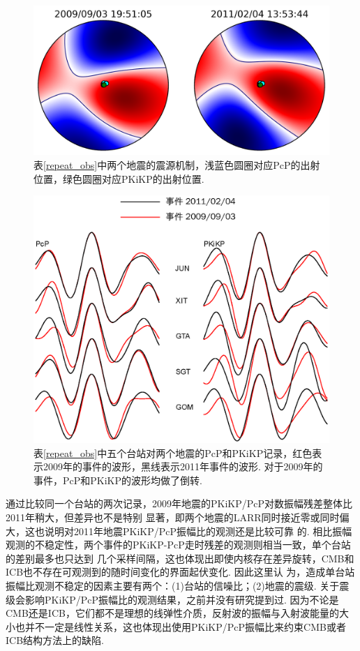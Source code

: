 \begin{figure}[ht]
\centering
\includegraphics[width=0.68\linewidth]{fig/chap4/mt.png}
\caption{表\ref{repeat_obs}中两个地震的震源机制，浅蓝色圆圈对应PcP的出射位置，绿色圆圈对应PKiKP的出射位置.}
\label{fig:mt}
\end{figure}

\begin{figure}[ht]
\centering
\includegraphics[width=0.8\linewidth]{fig/chap4/doublet_m}
\caption{表\ref{repeat_obs}中五个台站对两个地震的PcP和PKiKP记录，红色表示2009年的事件的波形，黑线表示2011年事件的波形. 对于2009年的事件，PcP和PKiKP的波形均做了倒转.}
\label{fig:doublet_m}
\end{figure}

通过比较同一个台站的两次记录，2009年地震的PKiKP/PcP对数振幅残差整体比2011年稍大，但差异也不是特别
显著，即两个地震的LARR同时接近零或同时偏大，这也说明对2011年地震PKiKP/PcP振幅比的观测还是比较可靠
的. 相比振幅观测的不稳定性，两个事件的PKiKP-PcP走时残差的观测则相当一致，单个台站的差别最多也只达到
几个采样间隔，这也体现出即使内核存在差异旋转，CMB和ICB也不存在可观测到的随时间变化的界面起伏变化. 因此这里认
为，造成单台站振幅比观测不稳定的因素主要有两个：(1)台站的信噪比；(2)地震的震级. 关于震级会影响PKiKP/PcP振幅比的观测结果，之前并没有研究提到过. 因为不论是CMB还是ICB，它们都不是理想的线弹性介质，反射波的振幅与入射波能量的大小也并不一定是线性关系，这也体现出使用PKiKP/PcP振幅比来约束CMB或者ICB结构方法上的缺陷.